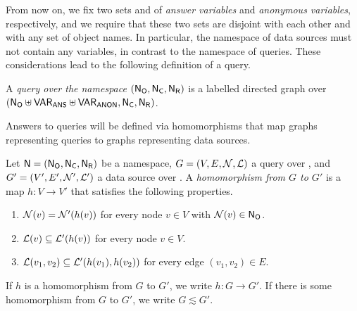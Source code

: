 From now on, we fix two sets \VARANS and \VARANON
of \emph{answer variables} and \emph{anonymous variables}, respectively,
and we require that these two sets are disjoint with each other
and with any set \NO of object names.
In particular, the namespace of data sources must not contain any variables,
in contrast to the namespace of queries.
These considerations lead to the following definition of a query.

\begin{definition}
  A \emph{query over the namespace $(\mathsf{N}_\mathsf{O},\mathsf{N}_\mathsf{C},\mathsf{N}_\mathsf{R})$} is a labelled directed graph
  over $(\mathsf{N}_\mathsf{O} \uplus \mathsf{VAR}_\mathsf{ANS} \uplus \mathsf{VAR}_\mathsf{ANON}, \mathsf{N}_\mathsf{C}, \mathsf{N}_\mathsf{R})$.
\end{definition}
%
%
Answers to queries will be defined via homomorphisms that map graphs representing queries
to graphs representing data sources.
%
\begin{definition}
  Let $\textup{\textsf{N}}=(\mathsf{N}_\mathsf{O},\mathsf{N}_\mathsf{C},\mathsf{N}_\mathsf{R})$ be a namespace, $G = (V,E,\mathcal{N},\mathcal{L})$ a query over \namespace,
  and $G' = (V',E',\mathcal{N}',\mathcal{L}')$ a data source over \namespace.
  A \emph{homomorphism from $G$ to $G'$} is a map $h : V \to V'$ that satisfies the following properties.
  \begin{enumerate}
    \item[\hmph{1}]
      $\mathcal{N}(v) = \mathcal{N}'(h(v))$ for every node $v \in V$ with $\mathcal{N}(v) \in \mathsf{N}_\mathsf{O}$.
    \item[\hmph{2}]
      $\mathcal{L}(v) \subseteq \mathcal{L}'(h(v))$ for every node $v \in V$.
    \item[\hmph{3}]
      $\mathcal{L}(v_1, v_2) \subseteq \mathcal{L}'(h(v_1), h(v_2))$
      for every edge $(v_1,v_2) \in E$.
  \end{enumerate}
  If $h$ is a homomorphism from $G$ to $G'$, we write $h : G \to G'$.
  If there is some homomorphism from $G$ to $G'$, we write $G \lesssim G'$.
\end{definition}
